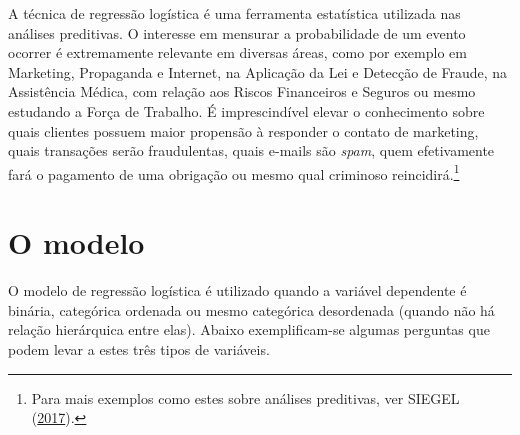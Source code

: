 \documentclass[12pt,brazil,oneside]{book}
\let\rmarkdownfootnote\footnote%
\def\footnote{\protect\rmarkdownfootnote}
\begin{document}
A técnica de regressão logística é uma ferramenta estatística utilizada
nas análises preditivas. O interesse em mensurar a probabilidade de um
evento ocorrer é extremamente relevante em diversas áreas, como por
exemplo em Marketing, Propaganda e Internet, na Aplicação da Lei e
Detecção de Fraude, na Assistência Médica, com relação aos Riscos
Financeiros e Seguros ou mesmo estudando a Força de Trabalho. É
imprescindível elevar o conhecimento sobre quais clientes possuem maior
propensão à responder o contato de marketing, quais transações serão
fraudulentas, quais e-mails são \emph{spam}, quem efetivamente fará o
pagamento de uma obrigação ou mesmo qual criminoso reincidirá.\footnote{Para
  mais exemplos como estes sobre análises preditivas, ver SIEGEL
  (\protect\hyperlink{ref-Siegel2017}{2017}).}

\hypertarget{o-modelo}{%
\section{O modelo}\label{o-modelo}}

O modelo de regressão logística é utilizado quando a variável dependente
é binária, categórica ordenada ou mesmo categórica desordenada (quando
não há relação hierárquica entre elas). Abaixo exemplificam-se algumas
perguntas que podem levar a estes três tipos de variáveis.
\end{document}
